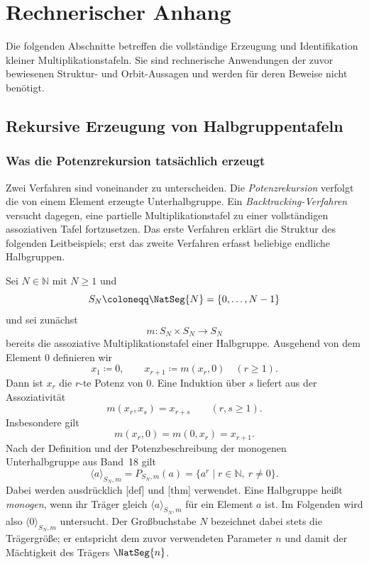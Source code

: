 \documentclass[main.tex]{subfiles}
\begin{document}
\chapter{Rechnerischer Anhang}

Die folgenden Abschnitte betreffen die vollständige Erzeugung und
Identifikation kleiner Multiplikationstafeln.  Sie sind rechnerische
Anwendungen der zuvor bewiesenen Struktur- und Orbit-Aussagen und werden
für deren Beweise nicht benötigt.

\section{Rekursive Erzeugung von Halbgruppentafeln}

\subsection{Was die Potenzrekursion tatsächlich erzeugt}

Zwei Verfahren sind voneinander zu unterscheiden.  Die
\emph{Potenzrekursion} verfolgt die von einem Element erzeugte
Unterhalbgruppe.  Ein \emph{Backtracking-Verfahren} versucht dagegen, eine
partielle Multiplikationstafel zu einer vollständigen assoziativen Tafel
fortzusetzen.  Das erste Verfahren erklärt die Struktur des folgenden
Leitbeispiels; erst das zweite Verfahren erfasst beliebige endliche
Halbgruppen.

Sei \(N\in\mathbb N\) mit \(N\geq1\) und
\[
  S_N\coloneqq\NatSeg{N}=\{0,\ldots,N-1\}
\]
und sei zunächst
\[
  m\colon S_N\times S_N\to S_N
\]
bereits die assoziative Multiplikationstafel einer Halbgruppe.  Ausgehend von
dem Element \(0\) definieren wir
\[
  x_1\coloneqq0,
  \qquad
  x_{r+1}\coloneqq m(x_r,0)
  \quad(r\geq1).
\]
Dann ist \(x_r\) die \(r\)-te Potenz von \(0\).  Eine Induktion über \(s\)
liefert aus der Assoziativität
\[
  \boxed{m(x_r,x_s)=x_{r+s}}
  \qquad(r,s\geq1).
\]
Insbesondere gilt
\[
  m(x_r,0)=m(0,x_r)=x_{r+1}.
\]
Nach der Definition und der Potenzbeschreibung der monogenen
Unterhalbgruppe aus Band~18 gilt
\[
  \langle a\rangle_{S_N,m}
  =P_{S_N,m}(a)
  =\{a^r\mid r\in\mathbb N,\ r\neq0\}.
\]
Dabei werden ausdrücklich
[def] und
[thm] verwendet.  Eine
Halbgruppe heißt \emph{monogen}, wenn ihr Träger gleich
\(\langle a\rangle_{S_N,m}\) für ein Element \(a\) ist.  Im Folgenden wird
also \(\langle0\rangle_{S_N,m}\) untersucht.  Der Großbuchstabe \(N\) bezeichnet dabei
stets die Trägergröße; er entspricht dem zuvor verwendeten Parameter \(n\)
und damit der Mächtigkeit des Trägers \(\NatSeg{n}\).
\end{document}
